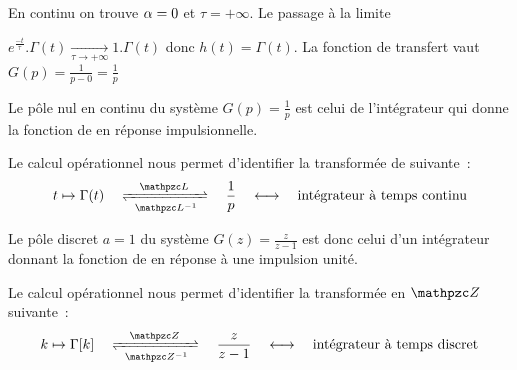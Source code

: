 \noindent
\begin{minipage}{0.6\linewidth}
\end{minipage}
\begin{minipage}{0.4\linewidth}
  En continu on trouve $\alpha=0$ et $\tau=+\infty$. Le passage à la
  limite
  
  $e^{\frac{-t}{\tau}}.\Gamma(t)\underset{\tau\to+\infty}{\to}
  1.\Gamma(t)$ donc $h(t)=\Gamma(t)$. La fonction de transfert vaut
  $G(p)=\frac{1}{p-0}=\frac{1}{p}$
\end{minipage}

Le pôle nul en continu du système $G(p)=\frac{1}{p}$ est celui de
l'intégrateur qui donne la fonction de \Heaviside{} en réponse
impulsionnelle.

Le calcul opérationnel nous permet d'identifier la transformée de
\Laplace{} suivante~:
\begin{equation}
  \label{eq:Laplace_integrateur}
  t \mapsto \Gamma(t) \quad \xrightleftharpoons[\L^{-1}]{\quad \L\quad} \quad \frac{1}{p} \quad \longleftrightarrow \quad \text{intégrateur à temps continu}
\end{equation}


Le pôle discret $a=1$ du système $G(z)=\frac{z}{z-1}$ est donc celui
d'un intégrateur donnant la fonction de \Heaviside{} en réponse à une
impulsion unité.

Le calcul opérationnel nous permet d'identifier la transformée en
$\TZ{}$ suivante~:
\begin{equation}
  \label{eq:Z_integrateur}
  k \mapsto \Gamma[k] \quad \xrightleftharpoons[\TZi{}]{\quad\TZ{}\quad} \quad \frac{z}{z-1} \quad \longleftrightarrow \quad \text{intégrateur à temps discret}
\end{equation}

